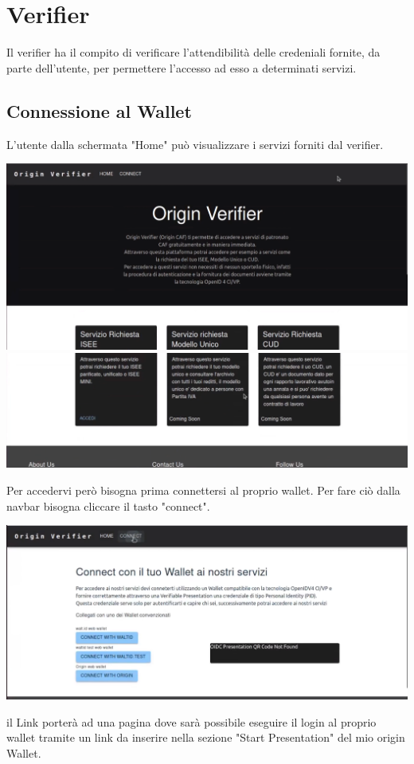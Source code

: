 \section{Verifier}
Il verifier ha il compito di verificare l'attendibilità delle credeniali fornite, da parte dell'utente, per permettere l'accesso ad esso a determinati servizi. 
\subsection{Connessione al Wallet}
L'utente dalla schermata "Home" può visualizzare i servizi forniti dal verifier.\\
\begin{center}
    \includegraphics[scale = 0.2]{./res/img/verifier/homeverifier.png}
    \includegraphics[scale = 0.2]{./res/img/verifier/homeverifier2.png}
    \end{center}
Per accedervi però bisogna prima connettersi al proprio wallet. Per fare ciò dalla navbar bisogna cliccare il tasto "connect".\\
\begin{center}
    \includegraphics[scale = 0.2]{./res/img/verifier/connessione1.png}
\end{center}
il Link porterà ad una pagina dove sarà possibile eseguire il login al proprio wallet tramite un link da inserire nella sezione "Start Presentation" del mio origin Wallet. 

